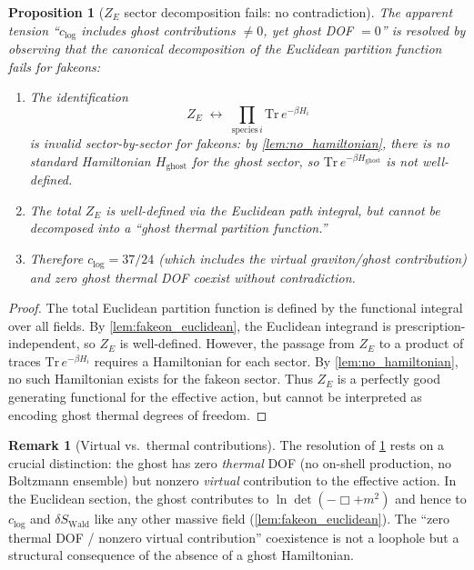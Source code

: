 \documentclass[11pt,a4paper]{article}
\theoremstyle{plain}
\newtheorem{proposition}[theorem]{Proposition}
\theoremstyle{definition}
\newtheorem{remark}[theorem]{Remark}
\begin{document}
\begin{proposition}[$Z_E$ sector decomposition fails: no contradiction]%
\label{prop:sector_decomposition}
  The apparent tension ``$c_{\log}$ includes ghost contributions
  $\neq 0$, yet ghost DOF $= 0$'' is resolved by observing that the
  canonical decomposition of the Euclidean partition function fails
  for fakeons:
  \begin{enumerate}[label=\textup{(\alph*)}]
    \item The identification
      \[
        Z_E \;\longleftrightarrow\;
        \prod_{\text{species}\,i}\mathrm{Tr}\,e^{-\beta H_i}
      \]
      is invalid sector-by-sector for fakeons: by
      \cref{lem:no_hamiltonian}, there is no standard Hamiltonian
      $H_{\mathrm{ghost}}$ for the ghost sector, so
      $\mathrm{Tr}\,e^{-\beta H_{\mathrm{ghost}}}$ is not
      well-defined.
    \item The total $Z_E$ \emph{is} well-defined via the Euclidean
      path integral, but cannot be decomposed into a ``ghost thermal
      partition function.''
    \item Therefore $c_{\log} = 37/24$ (which includes the
      virtual graviton/ghost contribution) and zero ghost thermal
      DOF coexist without contradiction.
  \end{enumerate}
\end{proposition}

\begin{proof}
  The total Euclidean partition function is defined by the functional
  integral over all fields.  By \cref{lem:fakeon_euclidean}, the
  Euclidean integrand is prescription-independent, so $Z_E$ is
  well-defined.  However, the passage from $Z_E$ to a product of
  traces $\mathrm{Tr}\,e^{-\beta H_i}$ requires a Hamiltonian for
  each sector.  By \cref{lem:no_hamiltonian}, no such Hamiltonian
  exists for the fakeon sector.  Thus $Z_E$ is a perfectly good
  generating functional for the effective action, but cannot be
  interpreted as encoding ghost thermal degrees of freedom.
\end{proof}

\begin{remark}[Virtual vs.\ thermal contributions]%
\label{rem:virtual_vs_thermal}
  The resolution of \cref{prop:sector_decomposition} rests on a
  crucial distinction: the ghost has zero \emph{thermal} DOF
  (no on-shell production, no Boltzmann ensemble) but nonzero
  \emph{virtual} contribution to the effective action.  In the
  Euclidean section, the ghost contributes to
  $\ln\det(-\Box + m^2)$ and hence to $c_{\log}$ and
  $\delta S_{\mathrm{Wald}}$ like any other massive field
  (\cref{lem:fakeon_euclidean}).  The ``zero thermal DOF /
  nonzero virtual contribution'' coexistence is not a loophole
  but a structural consequence of the absence of a ghost Hamiltonian.
\end{remark}
\end{document}
